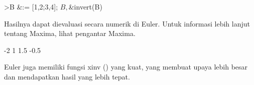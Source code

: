 \documentclass[12pt,arial,letterpaper]{book}
\begin{document}
\begin{eulernootebook}
\begin{eulercomment}
\begin{eulercomment}
\begin{eulernootebook}
\begin{eulercomment}
\begin{eulercomment}
\begin{eulercomment}
\begin{eulercomment}
\begin{eulercomment}
\begin{eulercomment}
\begin{eulerttcomment}
\end{eulerttcomment}
\begin{eulerprompt}
>B &:= [1,2;3,4]; $B, $&invert(B)
\end{eulerprompt}
\begin{eulercomment}
Hasilnya dapat dievaluasi secara numerik di Euler. Untuk informasi
lebih lanjut tentang Maxima, lihat pengantar Maxima.
\end{eulercomment}
\begin{euleroutput}
             -2             1 
            1.5          -0.5 
\end{euleroutput}
\begin{eulercomment}
Euler juga memiliki fungsi xinv () yang kuat, yang membuat upaya lebih
besar dan mendapatkan hasil yang lebih tepat.


\end{eulercomment}
\end{eulercomment}
\end{eulercomment}
\end{eulercomment}
\end{eulercomment}
\end{eulercomment}
\end{eulercomment}
\end{eulernootebook}
\end{eulercomment}
\end{eulercomment}
\end{eulernootebook}
\end{document}
